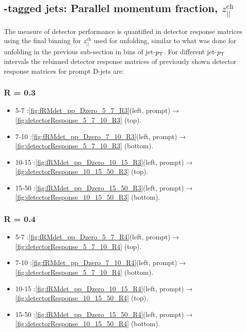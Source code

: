 \subsection{\Dzero-tagged jets: Parallel momentum fraction, $z_{||}^\text{ch}$}
The measure of detector performance is quantified in detector response matrices using the final binning for $z_{||}^\text{ch}$ used for unfolding, similar to what was done for unfolding in the previous sub-section in bins of jet-$p_{\text T}$.
For different jet-$p_{\text T}$ intervals the rebinned detector response matrices of previously shown detector response matrices for prompt D-jets are:
\subsubsection{R = 0.3}

\begin{itemize}
	\item 5-7   \GeVc:\ref{fig:fRMdet_pp_Dzero_5_7_R3}(left, prompt)$\rightarrow$\ref{fig:detectorResponse_5_7_10_R3} (top).
	\item 7-10  \GeVc:\ref{fig:fRMdet_pp_Dzero_7_10_R3}(left, prompt)$\rightarrow$\ref{fig:detectorResponse_5_7_10_R3} (bottom).
	\item 10-15 \GeVc:\ref{fig:fRMdet_pp_Dzero_10_15_R3}(left, prompt)$\rightarrow$\ref{fig:detectorResponse_10_15_50_R3} (top).
	\item 15-50 \GeVc:\ref{fig:fRMdet_pp_Dzero_15_50_R3}(left, prompt)$\rightarrow$\ref{fig:detectorResponse_10_15_50_R3} (bottom).
\end{itemize}
\subsubsection{R = 0.4}
\begin{itemize}
	\item 5-7   \GeVc:\ref{fig:fRMdet_pp_Dzero_5_7_R4}(left, prompt)$\rightarrow$\ref{fig:detectorResponse_5_7_10_R4} (top).
	\item 7-10  \GeVc:\ref{fig:fRMdet_pp_Dzero_7_10_R4}(left, prompt)$\rightarrow$\ref{fig:detectorResponse_5_7_10_R4} (bottom).
	\item 10-15 \GeVc:\ref{fig:fRMdet_pp_Dzero_10_15_R4}(left, prompt)$\rightarrow$\ref{fig:detectorResponse_10_15_50_R4} (top).
	\item 15-50 \GeVc:\ref{fig:fRMdet_pp_Dzero_15_50_R4}(left, prompt)$\rightarrow$\ref{fig:detectorResponse_10_15_50_R4} (bottom).
\end{itemize}

